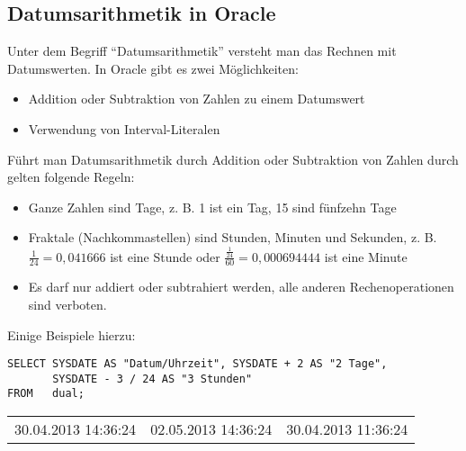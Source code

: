       \subsection{Datumsarithmetik in Oracle}
        Unter dem Begriff \enquote{Datumsarithmetik} versteht man das Rechnen mit Datumswerten. In Oracle gibt es zwei M\"oglichkeiten:
        \begin{itemize}
          \item Addition oder Subtraktion von Zahlen zu einem Datumswert
          \item Verwendung von Interval-Literalen
        \end{itemize}
        F\"uhrt man Datumsarithmetik durch Addition oder Subtraktion von Zahlen durch gelten folgende Regeln:
        \begin{itemize}
          \item Ganze Zahlen sind Tage, z. B. 1 ist ein Tag, 15 sind f\"unfzehn Tage
          \item Fraktale (Nachkommastellen) sind Stunden, Minuten und Sekunden, z. B. $\frac{1}{24}=0,041666$ ist eine Stunde oder $\frac{\frac{1}{24}}{60}=0,000694444$ ist eine Minute
          \item Es darf nur addiert oder subtrahiert werden, alle anderen Rechenoperationen sind verboten.
        \end{itemize}
        Einige Beispiele hierzu:
        \begin{lstlisting}[language=oracle_sql,caption={Einfache Datumsarithmetik in Oracle},label=sql03_19]
SELECT SYSDATE AS "Datum/Uhrzeit", SYSDATE + 2 AS "2 Tage",
       SYSDATE - 3 / 24 AS "3 Stunden"
FROM   dual;
        \end{lstlisting}
        \begin{center}
          \begin{small}
            \tablehead{}
            \tabletail {
            }
            \begin{oraclesql}
              \begin{supertabular}{lll}
                30.04.2013 14:36:24 & 02.05.2013 14:36:24 & 30.04.2013 11:36:24 \\
              \end{supertabular}
            \end{oraclesql}
          \end{small}
        \end{center}
